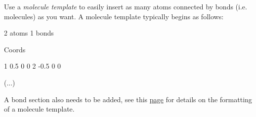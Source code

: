 \begin{tcolorbox}[colback=mylightblue!5!white,colframe=mylightblue!75!black,title=Hints]

\vspace{0.25cm} \noindent Use a \textit{molecule template} to easily insert as many atoms connected
by bonds (i.e. molecules) as you want. A molecule 
template typically begins as follows:

\begin{lcverbatim}
2 atoms
1 bonds

Coords

1 0.5 0 0
2 -0.5 0 0

(...)
\end{lcverbatim}

\noindent A bond section also needs to be added, see this
\href{https://docs.lammps.org/molecule.html}{page} for details on the formatting of a
molecule template.
\end{tcolorbox}

